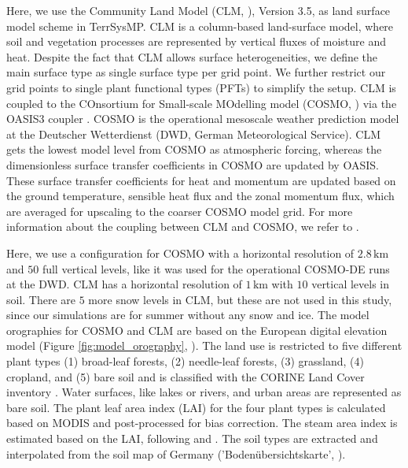 \documentclass[hess, manuscript]{copernicus}
\begin{document}
Here, we use the Community Land Model (CLM, \citealt{oleson_technical_2004, oleson_k._w._improvements_2008}), Version 3.5, as land surface model scheme in TerrSysMP.
CLM is a column-based land-surface model, where soil and vegetation processes are represented by vertical fluxes of moisture and heat.
Despite the fact that CLM allows surface heterogeneities, we define the main surface type as single surface type per grid point.
We further restrict our grid points to single plant functional types (PFTs) to simplify the setup.
CLM is coupled to the COnsortium for Small-scale MOdelling model (COSMO, \citealt{baldauf_operational_2011}) via the OASIS3 coupler \citep{valcke_oasis3_2013}.
COSMO is the operational mesoscale weather prediction model at the Deutscher Wetterdienst (DWD, German Meteorological Service).
CLM gets the lowest model level from COSMO as atmospheric forcing, whereas the dimensionless surface transfer coefficients in COSMO are updated by OASIS.
These surface transfer coefficients for heat and momentum are updated based on the ground temperature, sensible heat flux and the zonal momentum flux, which are averaged for upscaling to the coarser COSMO model grid. 
For more information about the coupling between CLM and COSMO, we refer to \citet{shrestha_scale-consistent_2014}.

Here, we use a configuration for COSMO with a horizontal resolution of $2.8\,\text{km}$ and $50$ full vertical levels, like it was used for the operational COSMO-DE runs at the DWD.
CLM has a horizontal resolution of $1\,\text{km}$ with $10$ vertical levels in soil.
There are $5$ more snow levels in CLM, but these are not used in this study, since our simulations are for summer without any snow and ice.
The model orographies for COSMO and CLM are based on the European digital elevation model (Figure \ref{fig:model_orography}, \citealt{european_environment_agency_digital_2013}).
The land use is restricted to five different plant types (1) broad-leaf forests, (2) needle-leaf forests, (3) grassland, (4) cropland, and
(5) bare soil and is classified with the CORINE Land Cover inventory \citep{keil_corine_2011}.
Water surfaces, like lakes or rivers, and urban areas are represented as bare soil.
The plant leaf area index (LAI) for the four plant types is calculated based on MODIS \citep{myneni_global_2002} and post-processed for bias correction.
The steam area index is estimated based on the LAI, following \citet{lawrence_representing_2007} and \citet{zeng_coupling_2002}.
The soil types are extracted and interpolated from the soil map of Germany ('Boden\"ubersichtskarte', \citealt{bundesanstalt_fuer_geowissenschaften_und_rohstoffe_bodenuebersichtskarte_2016}).
\end{document}
